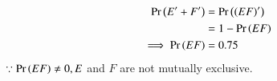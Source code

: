  \begin{align} 
	 \Pr\left(E^\prime+ F^\prime\right)&= \Pr\left(\left(EF\right)^\prime\right)
	 \\
	 &=1-\Pr\left(EF\right)
	 \\
	 \implies \Pr\left(EF\right)&=0.75 
 \end{align}	
 $\because \Pr\left(EF\right)\ne 0, E$ and $F$ are not mutually exclusive.
 
